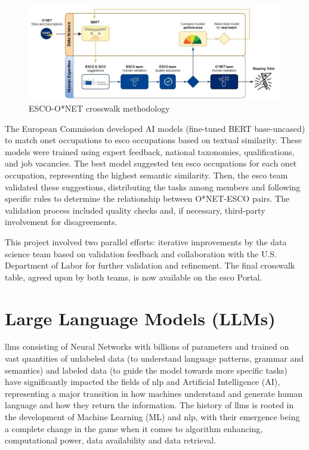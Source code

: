 \begin{figure}[H]
    \centering
    \includegraphics[width=15cm]{figs/crosswalk.png}
    \caption{ESCO-O*NET crosswalk methodology~\cite{esco_onet_crosswalk}}
    \label{fig:crosswalk}
\end{figure}

The European Commission developed AI models (fine-tuned BERT base-uncased) to match \ac{onet} occupations to \ac{esco} occupations based on textual similarity. These models were trained using expert feedback, national taxonomies, qualifications, and job vacancies. The best model suggested ten \ac{esco} occupations for each \ac{onet} occupation, representing the highest semantic similarity. Then, the \ac{esco} team validated these suggestions, distributing the tasks among members and following specific rules to determine the relationship between O*NET-ESCO pairs. The validation process included quality checks and, if necessary, third-party involvement for disagreements. 

This project involved two parallel efforts: iterative improvements by the data science team based on validation feedback and collaboration with the U.S. Department of Labor for further validation and refinement. The final crosswalk table, agreed upon by both teams, is now available on the \ac{esco} Portal.

\section{Large Language Models (LLMs)}
\label{sec:llms}

\ac{llms} consisting of Neural Networks with billions of parameters and trained on vast quantities of unlabeled data (to understand language patterns, grammar and semantics) and labeled data (to guide the model towards more specific tasks)~\cite{lyu2023improving} have significantly impacted the fields of \ac{nlp} and Artificial Intelligence (AI), representing a major transition in how machines understand and generate human language and how they return the information. The history of \ac{llms} is rooted in the development of Machine Learning (ML) and \ac{nlp}, with their emergence being a complete change in the game when it comes to algorithm enhancing, computational power, data availability and data retrieval.

